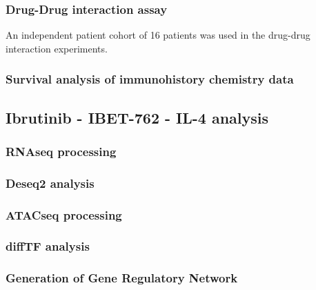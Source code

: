 \documentclass[11pt, a4paper, twosided]{book}
\begin{document}
\hypertarget{drug-drug-interaction-assay}{%
\subsubsection{Drug-Drug interaction assay}\label{drug-drug-interaction-assay}}

An independent patient cohort of 16 patients was used in the drug-drug interaction experiments.

\hypertarget{survival-analysis-of-immunohistory-chemistry-data}{%
\subsubsection{Survival analysis of immunohistory chemistry data}\label{survival-analysis-of-immunohistory-chemistry-data}}

\hypertarget{ibrutinib---ibet-762---il-4-analysis}{%
\subsection{Ibrutinib - IBET-762 - IL-4 analysis}\label{ibrutinib---ibet-762---il-4-analysis}}

\hypertarget{rnaseq-processing}{%
\subsubsection{RNAseq processing}\label{rnaseq-processing}}

\hypertarget{deseq2-analysis}{%
\subsubsection{Deseq2 analysis}\label{deseq2-analysis}}

\hypertarget{atacseq-processing-1}{%
\subsubsection{ATACseq processing}\label{atacseq-processing-1}}

\hypertarget{difftf-analysis}{%
\subsubsection{diffTF analysis}\label{difftf-analysis}}

\hypertarget{generation-of-gene-regulatory-network}{%
\subsubsection{Generation of Gene Regulatory Network}\label{generation-of-gene-regulatory-network}}
\end{document}
